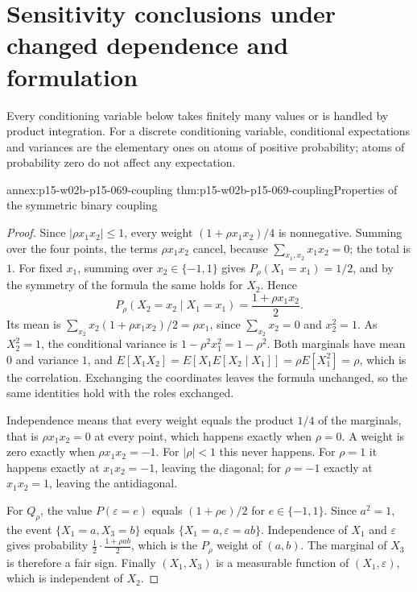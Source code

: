 \section{Sensitivity conclusions under changed dependence and formulation}
\label{sec:annex-p15-w02b-p15-069-assumption-sensitivity}

Every conditioning variable below takes finitely many values or is handled
by product integration. For a discrete conditioning variable, conditional
expectations and variances are the elementary ones on atoms of positive
probability; atoms of probability zero do not affect any expectation.

\begin{annexitem}{annex:p15-w02b-p15-069-coupling}
 {thm:p15-w02b-p15-069-coupling}{Properties of the symmetric binary coupling}
\begin{proof}
Since \(|\rho x_1x_2|\leq1\), every weight \((1+\rho x_1x_2)/4\) is
nonnegative. Summing over the four points, the terms \(\rho x_1x_2\) cancel,
because \(\sum_{x_1,x_2}x_1x_2=0\); the total is \(1\).
For fixed \(x_1\), summing over \(x_2\in\{-1,1\}\) gives
\(P_\rho(X_1=x_1)=1/2\), and by the symmetry of the formula the same holds
for \(X_2\). Hence
\[
 P_\rho(X_2=x_2\mid X_1=x_1)=\frac{1+\rho x_1x_2}{2}.
\]
Its mean is
\(\sum_{x_2}x_2(1+\rho x_1x_2)/2=\rho x_1\), since \(\sum_{x_2}x_2=0\) and
\(x_2^2=1\). As \(X_2^2=1\), the conditional variance is
\(1-\rho^2x_1^2=1-\rho^2\). Both marginals have mean \(0\) and variance
\(1\), and \(E[X_1X_2]=E[X_1E[X_2\mid X_1]]=\rho E[X_1^2]=\rho\), which is
the correlation. Exchanging the coordinates leaves the formula unchanged,
so the same identities hold with the roles exchanged.

Independence means that every weight equals the product \(1/4\) of the
marginals, that is \(\rho x_1x_2=0\) at every point, which happens exactly
when \(\rho=0\). A weight is zero exactly when \(\rho x_1x_2=-1\). For
\(|\rho|<1\) this never happens. For \(\rho=1\) it happens exactly at
\(x_1x_2=-1\), leaving the diagonal; for \(\rho=-1\) exactly at
\(x_1x_2=1\), leaving the antidiagonal.

For \(Q_\rho\), the value \(P(\varepsilon=e)\) equals \((1+\rho e)/2\) for
\(e\in\{-1,1\}\). Since \(a^2=1\), the event \(\{X_1=a,X_3=b\}\) equals
\(\{X_1=a,\varepsilon=ab\}\). Independence of \(X_1\) and \(\varepsilon\)
gives probability \(\tfrac12\cdot\tfrac{1+\rho ab}{2}\), which is the
\(P_\rho\) weight of \((a,b)\). The marginal of \(X_3\) is therefore a fair
sign. Finally \((X_1,X_3)\) is a measurable function of
\((X_1,\varepsilon)\), which is independent of \(X_2\).
\end{proof}
\end{annexitem}

